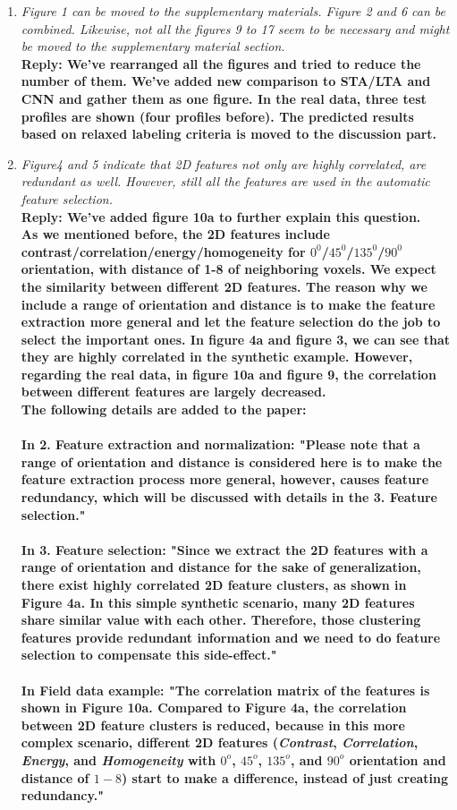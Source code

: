 \begin{enumerate}
\item \textsl{Figure 1 can be moved to the supplementary materials. Figure 2 and 6 can be combined. Likewise, not all the figures 9 to 17 seem to be necessary and might be moved to the supplementary material section.}\\
\textbf{Reply: We've rearranged all the figures and tried to reduce the number of them. We've added new comparison to STA/LTA and CNN and gather them as one figure. In the real data, three test profiles are shown (four profiles before). The predicted results based on relaxed labeling criteria is moved to the discussion part.}

\item \textsl{Figure4 and 5 indicate that 2D features not only are highly correlated, are redundant as well. However, still all the features are used in the automatic feature selection.}\\
\textbf{Reply: We've added figure 10a to further explain this question.\\
As we mentioned before, the 2D features include contrast/correlation/energy/homogeneity for $0^0$/$45^0$/$135^0$/$90^0$ orientation, with distance of 1-8 of neighboring voxels. We expect the similarity between different 2D features. The reason why we include a range of orientation and distance is to make the feature extraction more general and let the feature selection do the job to select the important ones. In figure 4a and figure 3, we can see that they are highly correlated in the synthetic example. However, regarding the real data, in figure 10a and figure 9, the correlation between different features are largely decreased.\\
The following details are added to the paper:\\ \\
In \textbf{2. Feature extraction and normalization}: "Please note that a range of orientation and distance is considered here is to make the feature extraction process more general, however, causes feature redundancy, which will be discussed with details in the \textbf{3. Feature selection}."\\ \\
In \textbf{3. Feature selection}: "Since we extract the 2D features with a range of orientation and distance for the sake of generalization, there exist highly correlated 2D feature clusters, as shown in Figure 4a. In this simple synthetic scenario, many 2D features share similar value with each other. Therefore, those clustering features provide redundant information and we need to do feature selection to compensate this side-effect."\\ \\
In \textbf{Field data example}: "The correlation matrix of the features is shown in Figure 10a. Compared to Figure 4a, the correlation between 2D feature clusters is reduced, because in this more complex scenario, different 2D features (\textit{Contrast}, \textit{Correlation}, \textit{Energy}, and \textit{Homogeneity} with $0^o$, $45^o$, $135^o$, and $90^o$ orientation and distance of $1-8$) start to make a difference, instead of just creating redundancy."}


\end{enumerate}
